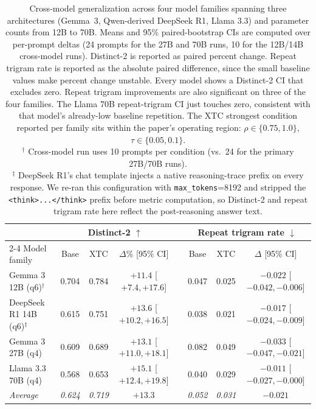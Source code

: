 \documentclass{article}
\newcommand{\xtc}{\textsc{XTC}}
\begin{document}
\begin{table}[h]
\centering
\small
\setlength{\tabcolsep}{5pt}
\begin{tabular}{@{}lccc c ccc@{}}
\toprule
& \multicolumn{3}{c}{Distinct-2 $\uparrow$} && \multicolumn{3}{c}{Repeat trigram rate $\downarrow$} \\
\cmidrule{2-4} \cmidrule{6-8}
Model family & Base & \xtc{} & $\Delta\%$ [95\% CI] && Base & \xtc{} & $\Delta$ [95\% CI] \\
\midrule
Gemma 3 12B (q6)$^{\dagger}$    & 0.704 & 0.784 & $+11.4$ \scriptsize{[$+7.4,+17.6$]}  && 0.047 & 0.025 & $-0.022$ \scriptsize{[$-0.042,-0.006$]} \\
DeepSeek R1 14B (q6)$^{\ddagger}$ & 0.615 & 0.751 & $+13.6$ \scriptsize{[$+10.2,+16.5$]} && 0.038 & 0.021 & $-0.017$ \scriptsize{[$-0.024,-0.009$]} \\
Gemma 3 27B (q4)         & 0.609 & 0.689 & $+13.1$ \scriptsize{[$+11.0,+18.1$]} && 0.082 & 0.049 & $-0.033$ \scriptsize{[$-0.047,-0.021$]} \\
Llama 3.3 70B (q4)       & 0.568 & 0.653 & $+15.1$ \scriptsize{[$+12.4,+19.8$]} && 0.040 & 0.029 & $-0.011$ \scriptsize{[$-0.027,-0.000$]} \\
\midrule
\textit{Average}         & \textit{0.624} & \textit{0.719} & \textit{$+13.3$} && \textit{0.052} & \textit{0.031} & \textit{$-0.021$} \\
\bottomrule
\end{tabular}
\caption{Cross-model generalization across four model families spanning three architectures (Gemma~3, Qwen-derived DeepSeek R1, Llama 3.3) and parameter counts from 12B to 70B. Means and 95\% paired-bootstrap CIs are computed over per-prompt deltas (24 prompts for the 27B and 70B runs, 10 for the 12B/14B cross-model runs). Distinct-2 is reported as paired percent change. Repeat trigram rate is reported as the absolute paired difference, since the small baseline values make percent change unstable. Every model shows a Distinct-2 CI that excludes zero. Repeat trigram improvements are also significant on three of the four families. The Llama 70B repeat-trigram CI just touches zero, consistent with that model's already-low baseline repetition. The \xtc{} strongest condition reported per family sits within the paper's operating region: $\rho \in \{0.75, 1.0\}$, $\tau \in \{0.05, 0.1\}$. \\
$^{\dagger}$ Cross-model run uses 10 prompts per condition (vs.\ 24 for the primary 27B/70B runs). \\
$^{\ddagger}$ DeepSeek R1's chat template injects a native reasoning-trace prefix on every response. We re-ran this configuration with \texttt{max\_tokens}=8192 and stripped the \texttt{<think>...</think>} prefix before metric computation, so Distinct-2 and repeat trigram rate here reflect the post-reasoning answer text.}
\label{tab:crossmodel}
\end{table}
\end{document}
